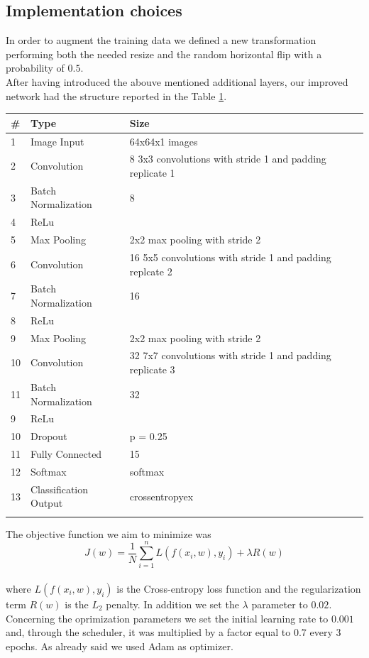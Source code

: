 \documentclass[12pt, a4paper]{report}
\begin{document}
\subsection*{Implementation choices}
In order to augment the training data we defined a new transformation performing both the needed resize and the random horizontal flip with a probability of $0.5$.\\
After having introduced the abouve mentioned additional layers, our improved network had the structure reported in the Table \ref{tab:final}.

\begin{table}[h!]
	\centering
	\begin{tabular}{lll}
		\# & Type & Size \\
		\midrule
		1 & Image Input & 64x64x1 images \\
		2 & Convolution & 8 3x3 convolutions with stride 1 and padding replicate 1 \\
		3 & Batch Normalization & 8 \\
		4 & ReLu & \\
		5 & Max Pooling & 2x2 max pooling with stride 2 \\
		6 & Convolution & 16 5x5 convolutions with stride 1 and padding replcate 2 \\
		7 & Batch Normalization & 16 \\
		8 & ReLu & \\
		9 & Max Pooling & 2x2 max pooling with stride 2 \\
		10 & Convolution & 32 7x7 convolutions with stride 1 and padding replicate 3 \\
		11 & Batch Normalization & 32 \\
		9 & ReLu & \\
		10 & Dropout & p = 0.25 \\
		11 & Fully Connected & 15 \\
		12 & Softmax & softmax \\
		13 & Classification Output & crossentropyex \\
		\bottomrule
		\label{tab:final}
	\end{tabular}
\end{table}

The objective function we aim to minimize was 
$$J(w) = \frac 1 N \sum_{i=1}^n L(f(x_i, w), y_i) + \lambda R(w)$$\\
where $L(f(x_i, w), y_i)$ is the Cross-entropy loss function and the regularization term $R(w)$ is the $L_2$ penalty. In addition we set the $\lambda$ parameter to $0.02$.\\
Concerning the oprimization parameters we set the initial learning rate to $0.001$ and, through the scheduler, it was multiplied by a factor equal to $0.7$ every $3$ epochs. As already said we used Adam as optimizer.\\
\end{document}
